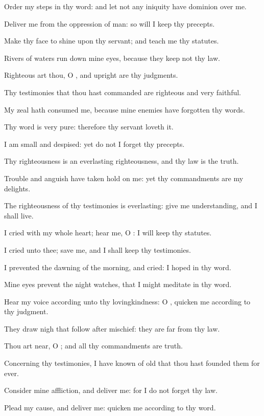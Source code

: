 \verse Order my steps in thy word: and let not any iniquity have dominion over me.

\verse Deliver me from the oppression of man: so will I keep thy precepts.

\verse Make thy face to shine upon thy servant; and teach me thy statutes.

\verse Rivers of waters run down mine eyes, because they keep not thy law.

\verse Righteous art thou, O \LORD, and upright are thy judgments.

\verse Thy testimonies that thou hast commanded are righteous and very faithful.

\verse My zeal hath consumed me, because mine enemies have forgotten thy words.

\verse Thy word is very pure: therefore thy servant loveth it.

\verse I am small and despised: yet do not I forget thy precepts.

\verse Thy righteousness is an everlasting righteousness, and thy law is the truth.

\verse Trouble and anguish have taken hold on me: yet thy commandments are my delights.

\verse The righteousness of thy testimonies is everlasting: give me understanding, and I shall live.

\verse I cried with my whole heart; hear me, O \LORD: I will keep thy statutes.

\verse I cried unto thee; save me, and I shall keep thy testimonies.

\verse I prevented the dawning of the morning, and cried: I hoped in thy word.

\verse Mine eyes prevent the night watches, that I might meditate in thy word.

\verse Hear my voice according unto thy lovingkindness: O \LORD, quicken me according to thy judgment.

\verse They draw nigh that follow after mischief: they are far from thy law.

\verse Thou art near, O \LORD; and all thy commandments are truth.

\verse Concerning thy testimonies, I have known of old that thou hast founded them for ever.

\verse Consider mine affliction, and deliver me: for I do not forget thy law.

\verse Plead my cause, and deliver me: quicken me according to thy word.

